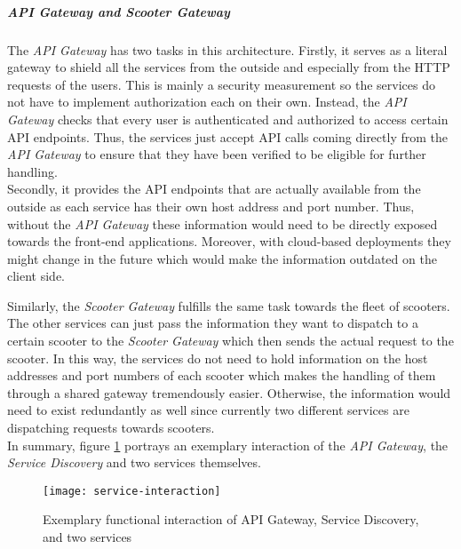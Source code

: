 \documentclass[12pt,a4paper]{report}
\begin{document}
\subparagraph{API Gateway and Scooter Gateway}
The \textit{API Gateway} has two tasks in this architecture.
Firstly, it serves as a literal gateway to shield all the services from
the outside and especially from the HTTP requests of the users.
This is mainly a security measurement so the services do not have to
implement authorization each on their own. Instead, the \textit{API Gateway}
checks that every user is authenticated and authorized to access certain
API endpoints. Thus, the services just accept API calls coming directly from
the \textit{API Gateway} to ensure that they have been verified to be eligible
for further handling.\\
Secondly, it provides the API endpoints that are actually available from the
outside as each service has their own host address and port number.
Thus, without the \textit{API Gateway} these information would need to be
directly exposed towards the front-end applications. Moreover, with cloud-based
deployments they might change in the future which would make the information
outdated on the client side.

Similarly, the \textit{Scooter Gateway} fulfills the same task towards the
fleet of scooters. The other services can just pass the
information they want to dispatch to a certain scooter to the
\textit{Scooter Gateway} which then sends the actual request to the scooter.
In this way, the services do not need to hold information on the host addresses
and port numbers of each scooter which makes the handling of them through
a shared gateway tremendously easier. Otherwise, the information would need
to exist redundantly as well since currently two different services are
dispatching requests towards scooters.\\

In summary, figure \ref{fig:service-interaction} portrays an exemplary interaction of the
\textit{API Gateway}, the \textit{Service Discovery} and two services themselves.

\begin{figure}[htb]
\centering
\texttt{[image: service-interaction]}
\caption{Exemplary functional interaction of API Gateway, Service Discovery, and two services}
\label{fig:service-interaction}
\end{figure}
\end{document}
